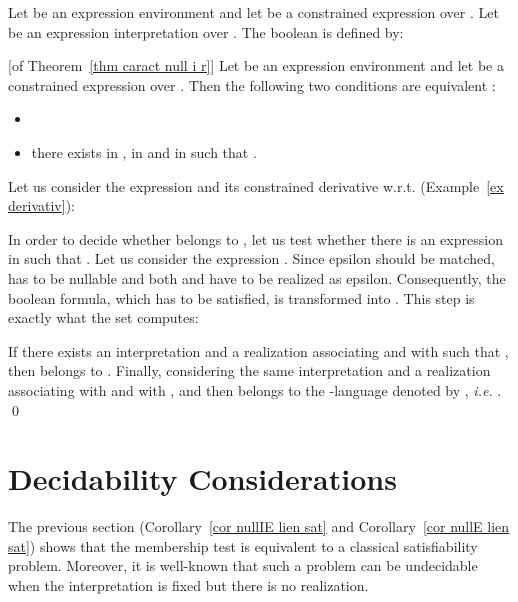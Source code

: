 \documentclass[a4paper]{llncs}
\begin{document}
 
  
  \begin{definition}[ Predicate]
    Let  be an expression environment and let  be a constrained expression over . Let  be  an expression interpretation over . The boolean  is defined by:
        
  \end{definition}
  
  \begin{corollary}\label{cor nullE lien sat}[of Theorem~\ref{thm caract null i r}]
    Let  be an expression environment and let  be a constrained expression over . Then the  following two conditions are equivalent :
    \begin{itemize}
        \item 
        \item there exists  in ,  in  and  in  such that .
     \end{itemize}
  \end{corollary}
  
  \begin{example}
    Let us consider the expression  and its constrained derivative w.r.t.  (Example~\ref{ex derivativ}):
              
      In order to decide whether  belongs to , let us test whether there is an expression  in  such that .
      Let us consider the expression . 
Since epsilon should be matched,  has to be nullable and both  and  have to be realized as epsilon. 
      Consequently, the boolean formula, which has to be satisfied, is transformed into . This step is exactly what the set  computes:
        
        If there exists an interpretation  and a realization  associating  and  with  such that , then  belongs to . Finally, considering the same interpretation and a realization  associating  with  and  with ,  and then  belongs to the -language denoted by , \emph{i.e.} .
      \qed
  \end{example}
  
  \section{Decidability Considerations}\label{sec:decidab}
  
  The previous section (Corollary~\ref{cor nullIE lien sat} and Corollary~\ref{cor nullE lien sat}) shows that the membership test is equivalent to a classical satisfiability problem. Moreover, it is well-known that such a problem can be undecidable when the interpretation is fixed but there is no realization.
  
\end{document}
